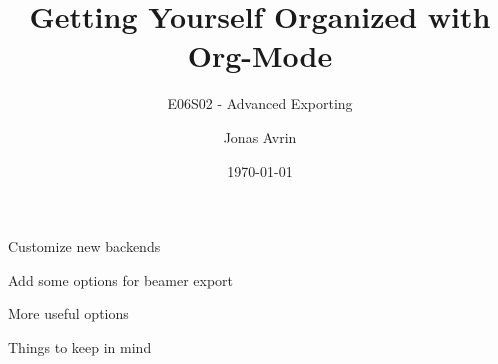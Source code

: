\documentclass[presentation]{beamer}
\author{Jonas Avrin}
\date{\today}
\title{Getting Yourself Organized with Org-Mode}
\subtitle{E06S02 - Advanced Exporting}
\begin{document}
\maketitle

\begin{frame}[label={sec:org70bbd95}]{Customize new backends}
\end{frame}
\begin{frame}[label={sec:org6575fdc}]{Add some options for beamer export}
\end{frame}
\begin{frame}[label={sec:orge501d96}]{More useful options}
\end{frame}
\begin{frame}[label={sec:org3da1798}]{Things to keep in mind}
\end{frame}
\end{document}
